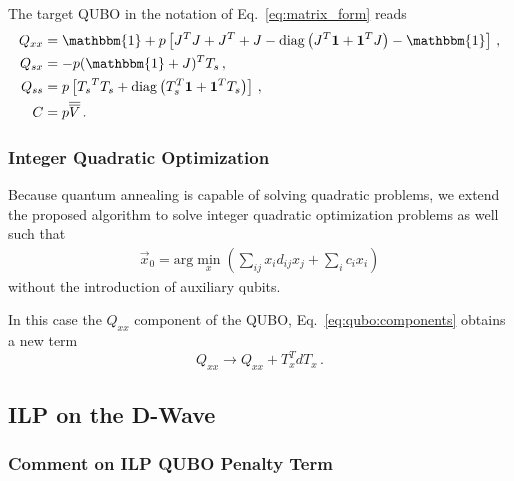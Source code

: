 \documentclass[10pt]{iopart}
\begin{document}
The target QUBO in the notation of Eq.~\eqref{eq:matrix_form} reads
 {\small
  \begin{align}
   Q_{xx} & = \mathbbm{1} + p\left[J^T J + J^T + J - \mathrm{diag}\left(J^T \vec 1 + \vec 1^T J\right) - \mathbbm{1} \right] \,, \\
   Q_{sx} & = - p(\mathbbm{1}+J)^TT_s\,,                                                                     \\
   Q_{ss} & = p\left[{T_s}^T T_s + \mathrm{diag}\left(T_s^T \vec 1 + \vec 1^T  T_s\right)\right]\,,                                  \\
   C      & =  p \overline{\overline{V}}\,.
  \end{align}}

\subsubsection{Integer Quadratic Optimization}
\label{sec:methods:ilp:quadratic}

Because quantum annealing is capable of solving quadratic problems, we extend the proposed algorithm to solve integer quadratic optimization problems as well such that
\begin{align}
 \vec x_0 = \mathrm{arg}\min\limits_{x}\left(\sum_{ij} x_i d_{ij} x_j + \sum_i c_i x_i\right)
\end{align}
without the introduction of auxiliary qubits.

In this case the $Q_{xx}$ component of the QUBO, Eq.~\eqref{eq:qubo:components} obtains a new term
\begin{equation}
    Q_{xx} \to Q_{xx} + T_x^T d T_x \, .
\end{equation}

\subsection{ILP on the D-Wave}
\label{sec:methods:ILP-on-D-Wave}

\subsubsection{Comment on ILP QUBO Penalty Term}
\label{sec:methods:ilp-qubo-comments}
\end{document}
